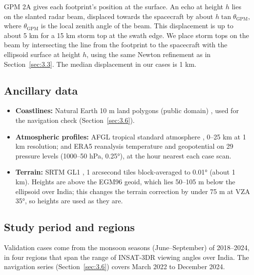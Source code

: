 GPM 2A gives each footprint's position at the surface. An echo at height \(h\) lies on the slanted radar beam, displaced towards the spacecraft by about \(h\tan\theta_{\mathrm{GPM}}\), where \(\theta_{\mathrm{GPM}}\) is the local zenith angle of the beam. This displacement is up to about 5 km for a 15 km storm top at the swath edge. We place storm tops on the beam by intersecting the line from the footprint to the spacecraft with the ellipsoid surface at height \(h\), using the same Newton refinement as in Section~\ref{sec:3.3}. The median displacement in our cases is 1 km.

\subsection{Ancillary data}\label{sec:2.3}

\begin{itemize}
\tightlist
\item
  \textbf{Coastlines:} Natural Earth 10 m land polygons (public domain) \citep{naturalearth}, used for the navigation check (Section~\ref{sec:3.6}).
\item
  \textbf{Atmospheric profiles:} AFGL tropical standard atmosphere \citep{anderson1986}, 0--25 km at 1 km resolution; and ERA5 reanalysis \citep{hersbach2020,c3s2018} temperature and geopotential on 29 pressure levels (1000--50 hPa, 0.25°), at the hour nearest each case scan.
\item
  \textbf{Terrain:} SRTM GL1 \citep{farr2007}, 1 arcsecond tiles block-averaged to 0.01° (about 1 km). Heights are above the EGM96 geoid, which lies 50--105 m below the ellipsoid over India; this changes the terrain correction by under 75 m at VZA 35°, so heights are used as they are.
\end{itemize}

\subsection{Study period and regions}\label{sec:2.4}

Validation cases come from the monsoon seasons (June--September) of 2018--2024, in four regions that span the range of INSAT-3DR viewing angles over India. The navigation series (Section~\ref{sec:3.6}) covers March 2022 to December 2024.

